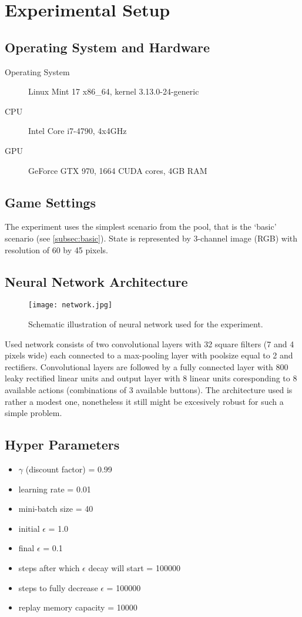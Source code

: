 \newpage
\section{Experimental Setup} 
	\subsection{Operating System and Hardware}
	\begin{description}
		\item[Operating System] Linux Mint 17 x86\_64, kernel 3.13.0-24-generic
		\item[CPU] Intel Core i7-4790, 4x4GHz
		\item[GPU] GeForce GTX 970, 1664 CUDA cores, 4GB RAM
	\end{description}

	\subsection{Game Settings}
		The experiment uses the simplest scenario from the pool, that is the `basic' scenario (see \ref{subsec:basic}). State is represented by 3-channel image (RGB) with resolution of 60 by 45 pixels.

	\subsection{Neural Network Architecture}
		\begin{figure}
			\centering
			\texttt{[image: network.jpg]}
			\caption{Schematic illustration of neural network used for the experiment.}\label{fig:network}
		\end{figure}
		 Used network consists of two convolutional layers with 32 square filters (7 and 4 pixels wide) each connected to a max-pooling layer with poolsize equal to 2 and rectifiers. Convolutional layers are followed by a fully connected layer with 800 leaky rectified linear units and output layer with 8 linear units coresponding to 8 available actions (combinations of 3 available buttons). The architecture used is rather a modest one, nonetheless it still might be excesively robust for such a simple problem.
	
	\subsection{Hyper Parameters}
		\begin{itemize}
		\item $\gamma$ (discount factor) = 0.99
		\item learning rate = 0.01
		\item mini-batch size = 40
		\item initial $\epsilon$ = 1.0
		\item final $\epsilon$ = 0.1
		\item steps after which $\epsilon$ decay will start = 100000
		\item steps to fully decrease $\epsilon$ = 100000
		\item replay memory  capacity = 10000
		\end{itemize}
	


